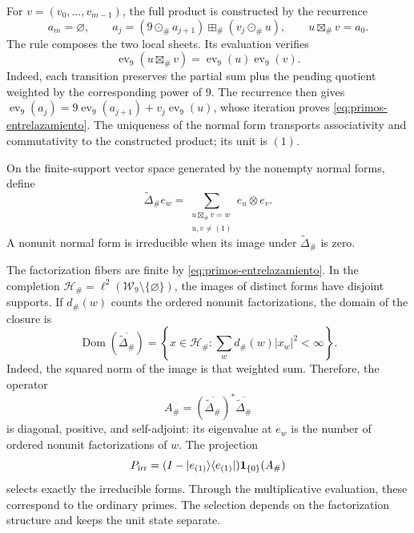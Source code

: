 For \(v=(v_0,\ldots,v_{m-1})\), the full product is constructed by
the recurrence
\[
 a_m=\varnothing,\qquad
 a_j=(9\odot_\#a_{j+1})\boxplus_\#(v_j\odot_\#u),
 \qquad u\boxtimes_\#v=a_0.
\]
The rule composes the two local sheets. Its evaluation verifies
\begin{equation}
 \operatorname{ev}_9(u\boxtimes_\#v)
   =\operatorname{ev}_9(u)\operatorname{ev}_9(v).
 \label{eq:primos-entrelazamiento}
\end{equation}
Indeed, each transition preserves the partial sum plus the pending quotient
weighted by the corresponding power of \(9\). The recurrence then gives
\(\operatorname{ev}_9(a_j)=9\operatorname{ev}_9(a_{j+1})+
v_j\operatorname{ev}_9(u)\), whose iteration proves
\eqref{eq:primos-entrelazamiento}. The uniqueness of the normal form transports
associativity and commutativity to the constructed product; its unit is \((1)\).

\begin{definition}
On the finite-support vector space generated by the nonempty normal
forms, define
\[
 \widetilde\Delta_\# e_w
 =\sum_{\substack{u\boxtimes_\#v=w\\u,v\ne(1)}}e_u\otimes e_v.
\]
A nonunit normal form is irreducible when its image under
\(\widetilde\Delta_\#\) is zero.
\end{definition}

The factorization fibers are finite by
\eqref{eq:primos-entrelazamiento}. In the completion
\(\mathcal H_\#=\ell^2(\mathcal W_9\setminus\{\varnothing\})\),
the images of distinct forms have disjoint supports. If
\(d_\#(w)\) counts the ordered nonunit factorizations, the domain
of the closure is
\[
 \operatorname{Dom}(\overline{\widetilde\Delta_\#})
 =\left\{x\in\mathcal H_\#:
       \sum_w d_\#(w)|x_w|^2<\infty\right\}.
\]
Indeed, the squared norm of the image is that weighted sum. Therefore,
the operator
\[
 A_\#=(\overline{\widetilde\Delta_\#})^*
                  \overline{\widetilde\Delta_\#}
\]
is diagonal, positive, and self-adjoint: its eigenvalue at \(e_w\) is the
number of ordered nonunit factorizations of \(w\). The projection
\[
 P_{\rm irr}=(I-|e_{(1)}\rangle\langle e_{(1)}|)
                    \mathbf1_{\{0\}}(A_\#)
\]
selects exactly the irreducible forms. Through the multiplicative
evaluation, these correspond to the ordinary primes. The selection
depends on the factorization structure and keeps the unit state separate.

